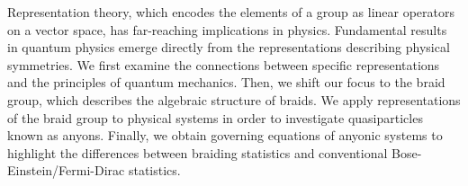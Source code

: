 Representation theory, which encodes the elements of a group as linear operators on a vector space, has far-reaching implications in physics. Fundamental results in quantum physics emerge directly from the representations describing physical symmetries. We first examine the connections between specific representations and the principles of quantum mechanics. Then, we shift our focus to the braid group, which describes the algebraic structure of braids. We apply representations of the braid group to physical systems in order to investigate quasiparticles known as anyons. Finally, we obtain governing equations of anyonic systems to highlight the differences between braiding statistics and conventional Bose-Einstein/Fermi-Dirac statistics.